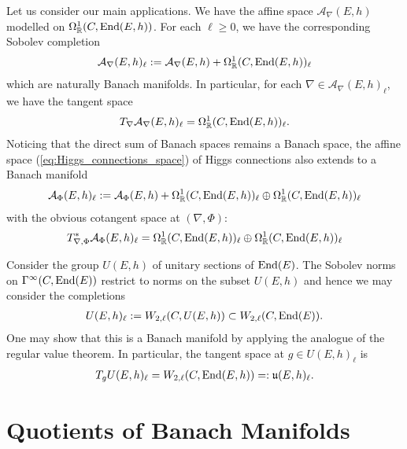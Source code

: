 \documentclass[12pt]{ociamthesis}  %
\begin{document}
\begin{example}
  Let us consider our main applications. We have the affine space
  $\mathcal A_\nabla(E,h)$ modelled on $\Omega^1_{\mathbb{R}}(C,\operatorname{End}(E,h))$.
  For each $\ell \geq 0$, we have the corresponding Sobolev completion
  \begin{align*}
    \mathcal A_\nabla(E,h)_\ell := \mathcal A_\nabla(E,h) + \Omega^1_{\mathbb{R}}(C,\operatorname{End}(E,h))_\ell
  \end{align*}
  which are naturally Banach manifolds.
  In particular, for each $\nabla\in \mathcal A_\nabla(E,h)_\ell$, we have the
  tangent space
  \begin{align*}
    T_\nabla \mathcal A_\nabla(E,h)_\ell
    = \Omega^1_{\mathbb{R}}(C,\operatorname{End}(E,h))_\ell.
  \end{align*}
  Noticing that the direct sum of Banach spaces remains a Banach space,
  the affine space (\ref{eq:Higgs_connections_space}) of Higgs connections also
  extends to a Banach manifold
  \begin{align*}
    \mathcal A_\Phi(E,h)_\ell := \mathcal A_\Phi(E,h) + \Omega^1_{\mathbb{R}}(C,\operatorname{End}(E,h))_\ell
    \oplus \Omega^1_{\mathbb{R}}(C,\operatorname{End}(E,h))_\ell
  \end{align*}
  with the obvious cotangent space at $(\nabla,\Phi)$:
  \begin{align*}
    T^*_{\nabla,\Phi} \mathcal A_\Phi(E,h)_\ell
    = \Omega^1_{\mathbb{R}}(C,\operatorname{End}(E,h))_\ell
    \oplus \Omega^1_{\mathbb{R}}(C,\operatorname{End}(E,h))_\ell
  \end{align*}
\end{example}

\begin{example}
  Consider the group $U(E,h)$ of unitary
  sections of $\operatorname{End}(E)$. The Sobolev norms on $\Gamma^\infty(C,\operatorname{End}(E))$
  restrict to norms on the subset $U(E,h)$ and hence we
  may consider the completions
  \begin{align*}
    U(E,h)_\ell := W_{2,\ell}(C,U(E,h)) \subset W_{2,\ell}(C,\operatorname{End}(E)).
  \end{align*}
  One may show that this is a Banach manifold by applying the
  analogue of the regular value theorem. In particular,
  the tangent space at $g\in U(E,h)_\ell$ is
  \begin{align*}
    T_g U(E,h)_\ell = W_{2,\ell}(C,\operatorname{End}(E,h)) =: \mathfrak u(E,h)_\ell.
  \end{align*}
\end{example}

\section{Quotients of Banach Manifolds}
\end{document}

